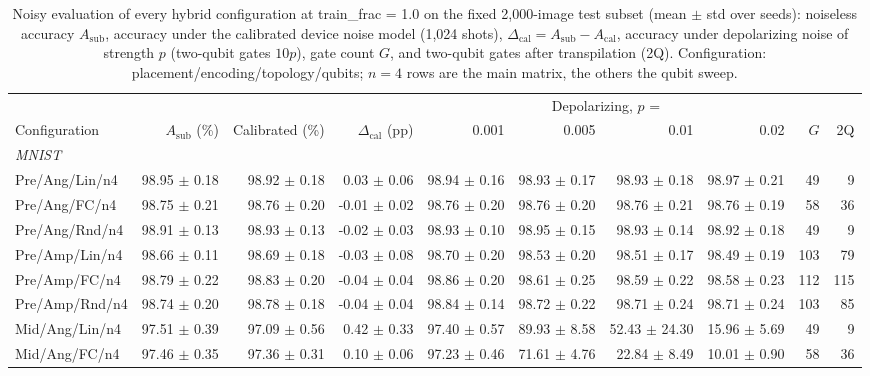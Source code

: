 \begin{table}[!t]
\centering
\caption{Noisy evaluation of every hybrid configuration at train\_frac = 1.0 on the fixed 2,000-image test subset (mean $\pm$ std over seeds): noiseless accuracy $A_\mathrm{sub}$, accuracy under the calibrated device noise model (1,024 shots), $\Delta_\mathrm{cal} = A_\mathrm{sub} - A_\mathrm{cal}$, accuracy under depolarizing noise of strength $p$ (two-qubit gates $10p$), gate count $G$, and two-qubit gates after transpilation (2Q). Configuration: placement/encoding/topology/qubits; $n = 4$ rows are the main matrix, the others the qubit sweep.}
\label{tab:noise}
\scriptsize
\setlength{\tabcolsep}{4pt}
\begin{tabular}{lrrrrrrrrr}
\toprule
 &  &  &  & \multicolumn{4}{c}{Depolarizing, $p$ =} &  &  \\
\cmidrule(lr){5-8}
Configuration & $A_\mathrm{sub}$ (\%) & Calibrated (\%) & $\Delta_\mathrm{cal}$ (pp) & 0.001 & 0.005 & 0.01 & 0.02 & $G$ & 2Q \\
\midrule
\multicolumn{10}{l}{\textit{MNIST}} \\
Pre/Ang/Lin/n4 & 98.95 $\pm$ 0.18 & 98.92 $\pm$ 0.18 & 0.03 $\pm$ 0.06 & 98.94 $\pm$ 0.16 & 98.93 $\pm$ 0.17 & 98.93 $\pm$ 0.18 & 98.97 $\pm$ 0.21 & 49 & 9 \\
Pre/Ang/FC/n4 & 98.75 $\pm$ 0.21 & 98.76 $\pm$ 0.20 & -0.01 $\pm$ 0.02 & 98.76 $\pm$ 0.20 & 98.76 $\pm$ 0.20 & 98.76 $\pm$ 0.21 & 98.76 $\pm$ 0.19 & 58 & 36 \\
Pre/Ang/Rnd/n4 & 98.91 $\pm$ 0.13 & 98.93 $\pm$ 0.13 & -0.02 $\pm$ 0.03 & 98.93 $\pm$ 0.10 & 98.95 $\pm$ 0.15 & 98.93 $\pm$ 0.14 & 98.92 $\pm$ 0.18 & 49 & 9 \\
Pre/Amp/Lin/n4 & 98.66 $\pm$ 0.11 & 98.69 $\pm$ 0.18 & -0.03 $\pm$ 0.08 & 98.70 $\pm$ 0.20 & 98.53 $\pm$ 0.20 & 98.51 $\pm$ 0.17 & 98.49 $\pm$ 0.19 & 103 & 79 \\
Pre/Amp/FC/n4 & 98.79 $\pm$ 0.22 & 98.83 $\pm$ 0.20 & -0.04 $\pm$ 0.04 & 98.86 $\pm$ 0.20 & 98.61 $\pm$ 0.25 & 98.59 $\pm$ 0.22 & 98.58 $\pm$ 0.23 & 112 & 115 \\
Pre/Amp/Rnd/n4 & 98.74 $\pm$ 0.20 & 98.78 $\pm$ 0.18 & -0.04 $\pm$ 0.04 & 98.84 $\pm$ 0.14 & 98.72 $\pm$ 0.22 & 98.71 $\pm$ 0.24 & 98.71 $\pm$ 0.24 & 103 & 85 \\
Mid/Ang/Lin/n4 & 97.51 $\pm$ 0.39 & 97.09 $\pm$ 0.56 & 0.42 $\pm$ 0.33 & 97.40 $\pm$ 0.57 & 89.93 $\pm$ 8.58 & 52.43 $\pm$ 24.30 & 15.96 $\pm$ 5.69 & 49 & 9 \\
Mid/Ang/FC/n4 & 97.46 $\pm$ 0.35 & 97.36 $\pm$ 0.31 & 0.10 $\pm$ 0.06 & 97.23 $\pm$ 0.46 & 71.61 $\pm$ 4.76 & 22.84 $\pm$ 8.49 & 10.01 $\pm$ 0.90 & 58 & 36 \\

\end{tabular}
\end{table}
